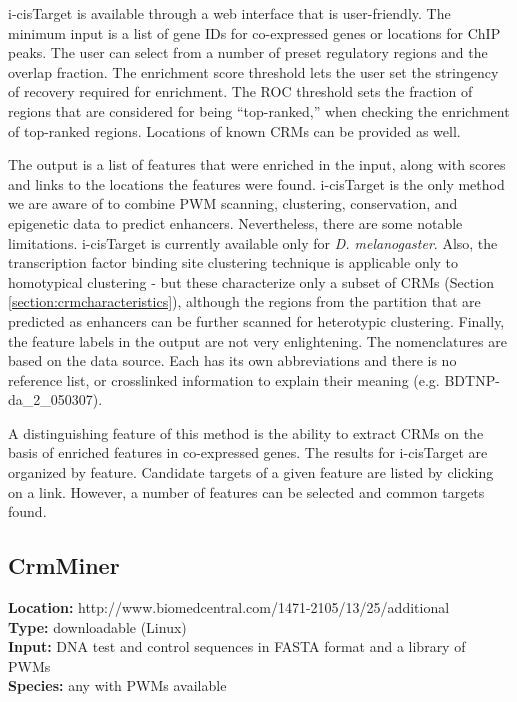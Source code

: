 \documentclass{frontiersENG} %
\begin{document}
i-cisTarget is available through a web interface that is
user-friendly. The minimum input is a list of gene IDs for
co-expressed genes or locations for ChIP peaks. The user can select
from a number of preset regulatory regions and the overlap
fraction. The enrichment score threshold lets the user set the
stringency of recovery required for enrichment. The ROC threshold sets
the fraction of regions that are considered for being ``top-ranked,''
when checking the enrichment of top-ranked regions. Locations of known
CRMs can be provided as well.

The output is a list of features that were enriched in the input,
along with scores and links to the locations the features were
found. i-cisTarget is the only method we are aware of to combine PWM
scanning, clustering, conservation, and epigenetic data to predict
enhancers. Nevertheless, there are some notable
limitations. i-cisTarget is currently available only for
\textit{D. melanogaster}. Also, the transcription factor binding site
clustering technique is applicable only to homotypical clustering -
but these characterize only a subset of CRMs (Section
\ref{section:crmcharacteristics}), although the regions from the
partition that are predicted as enhancers can be further scanned for
heterotypic clustering. Finally, the feature labels in the output
are not very enlightening. The nomenclatures are based on the data
source. Each has its own abbreviations and there is no reference list,
or crosslinked information to explain their meaning
(e.g. BDTNP-da\_2\_050307).

A distinguishing feature of this method is the ability to extract CRMs
on the basis of enriched features in co-expressed genes. The results
for i-cisTarget are organized by feature. Candidate targets of a given
feature are listed by clicking on a link. However, a number of
features can be selected and common targets found.

\subsection{CrmMiner}
\label{section:crmminer}
\noindent
\textbf{Location:} http://www.biomedcentral.com/1471-2105/13/25/additional \\
\textbf{Type:} downloadable (Linux) \\
\textbf{Input:} DNA test and control sequences in FASTA format and a library of PWMs \\
\textbf{Species:} any with PWMs available \\
\end{document}
